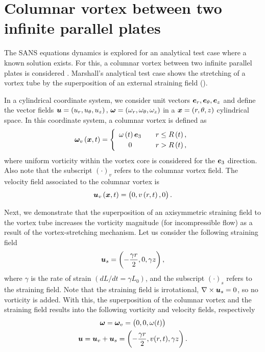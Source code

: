 \documentclass[../main.tex]{subfiles}
\begin{document}
\section{Columnar vortex between two infinite parallel plates}

The SANS equations dynamics is explored for an analytical test case where a known solution exists.
For this, a columnar vortex between two infinite parallel plates is considered \citep{Marshall2001}.
Marshall's analytical test case shows the stretching of a vortex tube by the superposition of an external straining field ().

In a cylindrical coordinate system, we consider unit vectors $\boldsymbol{e}_r,\boldsymbol{e}_\theta,\boldsymbol{e}_z$ and define the vector fields $\boldsymbol{u}=\left(u_r,u_\theta,u_z\right),\,\boldsymbol\omega=\left(\omega_r,\omega_\theta,\omega_z\right)$ in a $\boldsymbol{x}=\left(r,\theta,z\right)$ cylindrical space. In this coordinate system, a columnar vortex is defined as
\begin{equation}
{\boldsymbol\omega_v}\left(\boldsymbol{x},t \right)=\begin{cases}
\begin{array}{c}
\omega\left(t\right)\boldsymbol{e}_3\\
0
\end{array} & \begin{array}{c}
r\leq R\left(t\right),\\
r>R\left(t\right),
\end{array}\end{cases}
\end{equation}
where uniform vorticity within the vortex core is considered for the $\boldsymbol{e}_3$ direction.
Also note that the subscript $(\cdot)_v$ refers to the columnar vortex field.
The velocity field associated to the columnar vortex is
\begin{equation}
{\boldsymbol{u}_v}\left(\boldsymbol{x},t \right)=\left(0,v\left(r,t\right),0\right).
\end{equation}

Next, we demonstrate that the superposition of an axisymmetric straining field to the vortex tube increases the vorticity magnitude (for incompressible flow) as a result of the vortex-stretching mechanism.
Let us consider the following straining field
\begin{equation}
\boldsymbol{u}_s=\left(-\frac{\gamma r}{2},0,\gamma z \right),\label{eq:strain_field}
\end{equation}
where $\gamma$ is the rate of strain $(dL/dt=\gamma L_0)$, and the subscript $(\cdot)_s$ refers to the straining field.
Note that the straining field is irrotational, $\nabla\times\boldsymbol{u}_s=0$, so no vorticity is added.
With this, the superposition of the columnar vortex and the straining field results into the following vorticity and velocity fields, respectively
\begin{gather}
\boldsymbol\omega=\boldsymbol\omega_v=\left(0,0,\omega(t) \right)\label{eq:vorticity_field}\\
\boldsymbol{u}=\boldsymbol{u}_v+\boldsymbol{u}_s=\left(-\frac{\gamma r}{2},v(r,t),\gamma z \right).\label{eq:velocity_field}
\end{gather}
\end{document}
